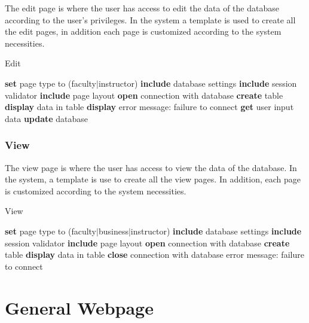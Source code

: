 		The edit page is where the user has access to edit the data of the database according to the user's privileges. In the system a template is used to create all the edit pages, in addition each page is customized according to the system necessities. 
		
		\begin{algorithm}[H]
		\caption{Edit}
			\begin{algorithmic}[1]
			\State \textbf{set} page type to (faculty$|$instructor) 
			\State \textbf{include} database settings
			\State \textbf{include} session validator
			\State \textbf{include} page layout
			\State \textbf{open} connection with database
				\State \textbf{create} table
				\EndIf
				\State \textbf{display} data in table
				\EndWhile
			\Else
			\State \textbf{display} error message: failure to connect 
			\EndIf
			\State \textbf{get} user input data
			\State \textbf{update} database
			
			\end{algorithmic}
		\end{algorithm}
		
		\subsubsection{View}
		The view page is where the user has access to view the data of the database. In the system, a template is use to create all the view pages. In addition, each page is customized according to the system necessities. 
		
		\begin{algorithm}[H]
		\caption{View}
			\begin{algorithmic}[1]
			\State \textbf{set} page type to (faculty$|$business$|$instructor) 
			\State \textbf{include} database settings
			\State \textbf{include} session validator
			\State \textbf{include} page layout
			\State \textbf{open} connection with database
				\State \textbf{create} table
				\EndIf
				\State \textbf{display} data in table
				\EndWhile
				\State \textbf{close} connection with database
			\Else
			\State error message: failure to connect 
			\EndIf
			\end{algorithmic}
		\end{algorithm}
		
\section{General Webpage}
